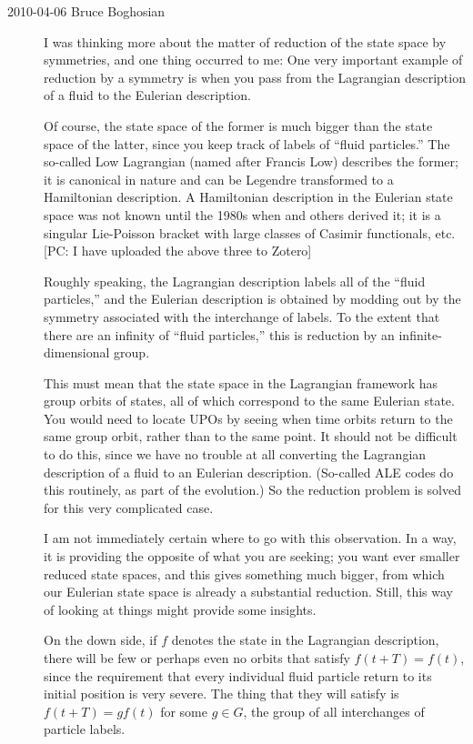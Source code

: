 \begin{description}
\item[2010-04-06 Bruce Boghosian] %

I was thinking more about the matter of reduction of the
state space by symmetries, and one thing occurred to me:  One
very important example of reduction by a symmetry is when you
pass from the Lagrangian description of a fluid to the
Eulerian description.

Of course, the state space of the former is much bigger than
the state space of the latter, since you keep track of labels
of ``fluid particles.''
													\toCB
The so-called Low Lagrangian (named
after Francis Low) describes the former; it is canonical in
nature and can be Legendre transformed to a Hamiltonian
description.  A Hamiltonian description in the Eulerian state
space was not known until the 1980s when
 and
others derived it; it is a singular Lie-Poisson bracket with
large classes of Casimir functionals, etc.
[PC: I have uploaded the above three 
to Zotero]

Roughly speaking, the Lagrangian description labels all of
the ``fluid particles,'' and the Eulerian description is
obtained by modding out by the symmetry associated with the
interchange of labels.  To the extent that there are an
infinity of ``fluid particles,'' this is reduction by an
infinite-dimensional group.

This must mean that the state space in the Lagrangian
framework has group orbits of states, all of which correspond
to the same Eulerian state.  You would need to locate UPOs by
seeing when time orbits return to the same group orbit,
rather than to the same point.  It should not be difficult to
do this, since we have no trouble at all converting the
Lagrangian description of a fluid to an Eulerian description.
(So-called ALE codes do this routinely, as part of the
evolution.)  So the reduction problem is solved for this very
complicated case.

I am not immediately certain where to go with this
observation.  In a way, it is providing the opposite of what
you are seeking; you want ever smaller reduced state spaces,
and this gives something much bigger, from which our Eulerian
state space is already a substantial reduction.  Still, this
way of looking at things might provide some insights.

On the down side, if $f$ denotes the state in the Lagrangian
description, there will be few or perhaps even no orbits that
satisfy $f(t+T) = f(t)$, since the requirement that every
individual fluid particle return to its initial position is
very severe.  The thing that they will satisfy is $f(t+T) = g
f(t)$ for some $g \in G$, the group of all interchanges of
particle labels.


\end{description}
